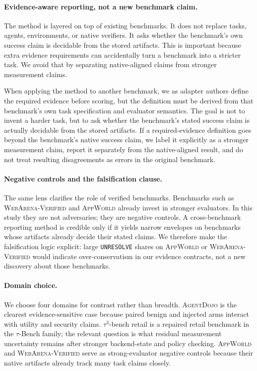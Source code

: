 \documentclass{article}
\newcommand{\agentdojo}{\textsc{AgentDojo}\xspace}
\newcommand{\appworld}{\textsc{AppWorld}\xspace}
\newcommand{\webarena}{\textsc{WebArena-Verified}\xspace}
\newcommand{\tauthree}{\(\tau^3\)-bench retail\xspace}
\begin{document}
\paragraph{Evidence-aware reporting, not a new benchmark claim.}
The method is layered on top of existing benchmarks. It does not replace tasks,
agents, environments, or native verifiers. It asks whether the benchmark's own
success claim is decidable from the stored artifacts. This is important because
extra evidence requirements can accidentally turn a benchmark into a stricter
task. We avoid that by separating native-aligned claims from stronger
measurement claims.

When applying the method to another benchmark, we as adapter authors define the
required evidence before scoring, but the definition must be derived from that
benchmark's own task specification and evaluator semantics. The goal is not to
invent a harder task, but to ask whether the benchmark's stated success claim is
actually decidable from the stored artifacts. If a required-evidence definition
goes beyond the benchmark's native success claim, we label it explicitly as a
stronger measurement claim, report it separately from the native-aligned result,
and do not treat resulting disagreements as errors in the original benchmark.

\paragraph{Negative controls and the falsification clause.}
The same lens clarifies the role of verified benchmarks. Benchmarks such as
\webarena and \appworld already invest in stronger evaluators. In this study
they are not adversaries; they are negative controls. A cross-benchmark
reporting method is credible only if it yields narrow envelopes on benchmarks
whose artifacts already decide their stated claims. We therefore make the
falsification logic explicit: large \texttt{UNRESOLVE} shares on \appworld or
\webarena would indicate over-conservatism in our evidence contracts, not a new
discovery about those benchmarks.

\paragraph{Domain choice.}
We choose four domains for contrast rather than breadth. \agentdojo is the
clearest evidence-sensitive case because paired benign and injected arms
interact with utility and security claims. \tauthree is a repaired retail
benchmark in the \(\tau\)-Bench family; the relevant question is what residual
measurement uncertainty remains after stronger backend-state and policy
checking. \appworld and \webarena serve as strong-evaluator negative controls
because their native artifacts already track many task claims closely.
\end{document}
